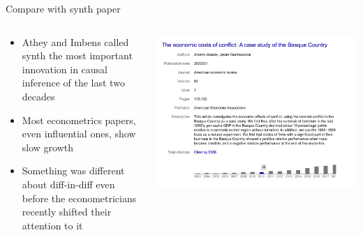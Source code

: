 \documentclass{beamer}
\begin{document}
\begin{frame}{Compare with synth paper}
  \begin{columns}
    \begin{column}{0.5\textwidth}
      \begin{itemize}
\item Athey and Imbens called synth the most important innovation in causal inference of the last two decades
\item Most econometrics papers, even influential ones, show slow growth
\item Something was different about diff-in-diff even before the econometricians recently shifted their attention to it
      \end{itemize}
    \end{column}
    \begin{column}{0.5\textwidth}
      \includegraphics[scale=0.25]{./lecture_includes/basque_synth}
    \end{column}
  \end{columns}
\end{frame}
\end{document}
